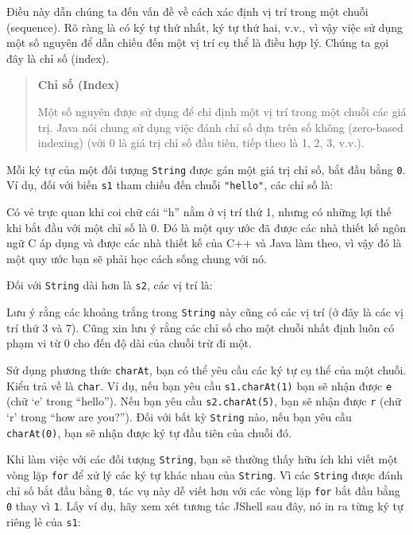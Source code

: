 Điều này dẫn chúng ta đến vấn đề về cách xác định vị trí trong một chuỗi
(sequence). Rõ ràng là có ký tự thứ nhất, ký tự thứ hai, v.v., vì vậy
việc sử dụng một số nguyên để dẫn chiếu đến một vị trí cụ thể là điều
hợp lý. Chúng ta gọi đây là chỉ số (index).

\begin{quote}
\textbf{Chỉ số (Index)}

Một số nguyên được sử dụng để chỉ định một vị trí trong một chuỗi các
giá trị. Java nói chung sử dụng việc đánh chỉ số dựa trên số không
(zero-based indexing) (với 0 là giá trị chỉ số đầu tiên, tiếp theo là 1,
2, 3, v.v.).
\end{quote}

Mỗi ký tự của một đối tượng \texttt{String} được gán một giá trị chỉ số,
bắt đầu bằng \texttt{0}. Ví dụ, đối với biến \texttt{s1} tham chiếu đến
chuỗi \texttt{"hello"}, các chỉ số là:

Có vẻ trực quan khi coi chữ cái ``h'' nằm ở vị trí thứ 1, nhưng có những
lợi thế khi bắt đầu với một chỉ số là 0. Đó là một quy ước đã được các
nhà thiết kế ngôn ngữ C áp dụng và được các nhà thiết kế của C++ và Java
làm theo, vì vậy đó là một quy ước bạn sẽ phải học cách sống chung với
nó.

Đối với \texttt{String} dài hơn là \texttt{s2}, các vị trí là:

Lưu ý rằng các khoảng trắng trong \texttt{String} này cũng có các vị trí
(ở đây là các vị trí thứ 3 và 7). Cũng xin lưu ý rằng các chỉ số cho một
chuỗi nhất định luôn có phạm vi từ 0 cho đến độ dài của chuỗi trừ đi
một.

Sử dụng phương thức \texttt{charAt}, bạn có thể yêu cầu các ký tự cụ thể
của một chuỗi. Kiểu trả về là \texttt{char}. Ví dụ, nếu bạn yêu cầu
\texttt{s1.charAt(1)} bạn sẽ nhận được
\texttt{\textquotesingle{}e\textquotesingle{}} (chữ `e' trong
``hello''). Nếu bạn yêu cầu \texttt{s2.charAt(5)}, bạn sẽ nhận được
\texttt{\textquotesingle{}r\textquotesingle{}} (chữ `r' trong ``how are
you?''). Đối với bất kỳ \texttt{String} nào, nếu bạn yêu cầu
\texttt{charAt(0)}, bạn sẽ nhận được ký tự đầu tiên của chuỗi đó.

Khi làm việc với các đối tượng \texttt{String}, bạn sẽ thường thấy hữu
ích khi viết một vòng lặp \texttt{for} để xử lý các ký tự khác nhau của
\texttt{String}. Vì các \texttt{String} được đánh chỉ số bắt đầu bằng
\texttt{0}, tác vụ này dễ viết hơn với các vòng lặp \texttt{for} bắt đầu
bằng \texttt{0} thay vì \texttt{1}. Lấy ví dụ, hãy xem xét tương tác
JShell sau đây, nó in ra từng ký tự riêng lẻ của \texttt{s1}:

